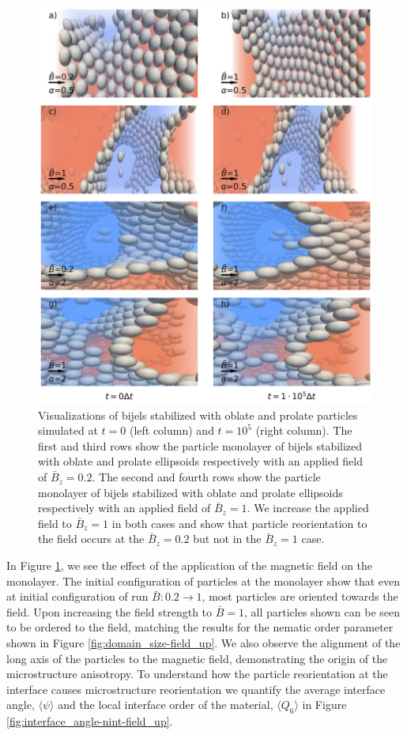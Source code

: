 \begin{figure} 
\centering 
\includegraphics[scale=0.2]{../figures/results/paper2/particle_viz-field_up.png} 
\caption{Visualizations of bijels stabilized with oblate and prolate particles simulated at $t = 0$ (left column) and $t = 10^5$ (right column). The first and third rows show the particle monolayer of bijels stabilized with oblate and prolate ellipsoids respectively with an applied field of $\bar{B}_z = 0.2$. The second and fourth rows show the particle monolayer of bijels stabilized with oblate and prolate ellipsoids respectively with an applied field of $\bar{B}_z = 1$. We increase the applied field to $\bar{B}_z = 1$ in both cases and show that particle reorientation to the field occurs at the $\bar{B}_z = 0.2$ but not in the $\bar{B}_z = 1$ case.} 
\label{fig:particle_viz-field_up} 
\end{figure}

In Figure \ref{fig:particle_viz-field_up}, we see the effect of the
application of the magnetic field on the monolayer. The initial
configuration of particles at the monolayer show that even at initial
configuration of run \(\bar{B}: 0.2 \rightarrow 1\), most particles are
oriented towards the field. Upon increasing the field strength to
\(\bar{B} = 1\), all particles shown can be seen to be ordered to the
field, matching the results for the nematic order parameter shown in
Figure \ref{fig:domain_size-field_up}. We also observe the alignment of
the long axis of the particles to the magnetic field, demonstrating the
origin of the microstructure anisotropy. To understand how the particle
reorientation at the interface causes microstructure reorientation we
quantify the average interface angle, \(\langle \psi \rangle\) and the
local interface order of the material, \(\langle Q_6 \rangle\) in Figure
\ref{fig:interface_angle-nint-field_up}.

